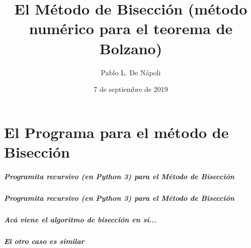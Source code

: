 \documentclass[11pt]{beamer}
\begin{document}
 
 

\title{El Método de Bisección (método numérico para el teorema de Bolzano) }
\author{Pablo L. De Nápoli}
\date{7 de septiembre de 2019}



\maketitle

\part{El Programa para el método de Bisección}

\frame{\partpage}
\begin{frame}
\frametitle{Programita recursivo (en Python 3) para el Método de
Bisección}


\frametitle{}



\end{frame}


\begin{frame} 

\frametitle{Programita recursivo (en Python 3) para el Método de
Bisección}


\frametitle{Acá viene el algoritmo de bisección en sí...}



\end{frame}
\begin{frame}


\frametitle{El otro caso es similar}



\end{frame}
\end{document}
